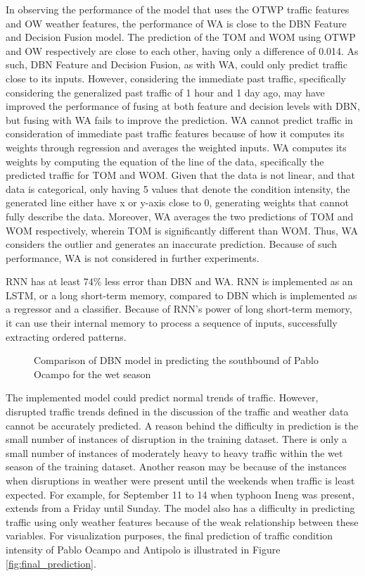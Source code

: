 In observing the performance of the model that uses the OTWP traffic features and OW weather features, the performance of WA is close to the DBN Feature and Decision Fusion model. The prediction of the TOM and WOM using OTWP and OW respectively are close to each other, having only a difference of 0.014. As such, DBN Feature and Decision Fusion, as with WA, could only predict traffic close to its inputs. However, considering the immediate past traffic, specifically considering the generalized past traffic of 1 hour and 1 day ago, may have improved the performance of fusing at both feature and decision levels with DBN, but fusing with WA fails to improve the prediction. WA cannot predict traffic in consideration of immediate past traffic features because of how it computes its weights through regression and averages the weighted inputs. WA computes its weights by computing the equation of the line of the data, specifically the predicted traffic for TOM and WOM. Given that the data is not linear, and that data is categorical, only having 5 values that denote the condition intensity, the generated line either have x or y-axis close to 0, generating weights that cannot fully describe the data. Moreover, WA averages the two predictions of TOM and WOM respectively, wherein TOM is significantly different than WOM. Thus, WA considers the outlier and generates an inaccurate prediction. Because of such performance, WA is not considered in further experiments. 

RNN has at least 74\% less error than DBN and WA. RNN is implemented as an LSTM, or a long short-term memory, compared to DBN which is implemented as a regressor and a classifier. Because of RNN’s power of long short-term memory, it can use their internal memory to process a sequence of inputs, successfully extracting ordered patterns. 

\begin{figure}[h]
  \centering
  \captionsetup{justification=centering}
  \caption{Comparison of DBN model in predicting the southbound of Pablo Ocampo for the wet season}
  \label{fig:dbn_comp_pocampo}
\end{figure}


The implemented model could predict normal trends of traffic. However, disrupted traffic trends defined in the discussion of the traffic and weather data cannot be accurately predicted. A reason behind the difficulty in prediction is the small number of instances of disruption in the training dataset. There is only a small number of instances of moderately heavy to heavy traffic within the wet season of the training dataset. Another reason may be because of the instances when disruptions in weather were present until the weekends when traffic is least expected. For example, for September 11 to 14 when typhoon Ineng was present, extends from a Friday until Sunday. The model also has a difficulty in predicting traffic using only weather features because of the weak relationship between these variables. For visualization purposes, the final prediction of traffic condition  intensity of Pablo Ocampo and Antipolo is illustrated in Figure \ref{fig:final_prediction}.

